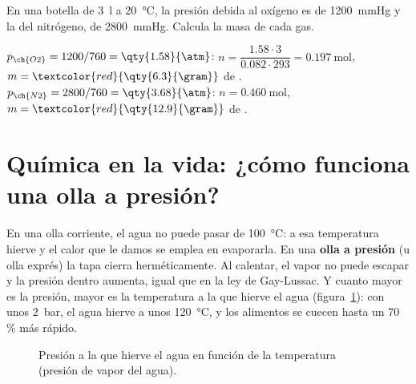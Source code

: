 \begin{exercise}
    En una botella de \qty{3}{\litre} a \qty{20}{\degreeCelsius}, la presión debida al oxígeno es de \qty{1200}{\mmHg} y la del
    nitrógeno, de \qty{2800}{\mmHg}. Calcula la masa de cada gas.
    \begin{solu}
        \(p_{\ch{O2}} = 1200/760 = \qty{1.58}{\atm}\): \(n = \dfrac{\num{1.58} \cdot 3}{\num{0.082} \cdot 293} = \qty{0.197}{\mole}\),
        \(m = \textcolor{red}{\qty{6.3}{\gram}}\) de .
        \(p_{\ch{N2}} = 2800/760 = \qty{3.68}{\atm}\): \(n = \qty{0.460}{\mole}\), \(m = \textcolor{red}{\qty{12.9}{\gram}}\) de .
    \end{solu}
\end{exercise}

\section{Química en la vida: ¿cómo funciona una olla a presión?}\label{sec:ud1-olla}

En una olla corriente, el agua no puede pasar de \qty{100}{\degreeCelsius}: a esa temperatura hierve y el calor que le
damos se emplea en evaporarla. En una \textbf{olla a presión} (u olla exprés) la tapa cierra herméticamente. Al calentar, el
vapor no puede escapar y la presión dentro aumenta, igual que en la ley de Gay-Lussac. Y cuanto mayor es la presión, mayor es
la temperatura a la que hierve el agua (figura~\ref{fig:ud1-olla}): con unos \qty{2}{\bar}, el agua hierve a unos
\qty{120}{\degreeCelsius}, y los alimentos se cuecen hasta un 70\,\% más rápido.

\begin{figure}[H]
    \centering
    \caption{Presión a la que hierve el agua en función de la temperatura (presión de vapor del agua).}
    \label{fig:ud1-olla}
\end{figure}

